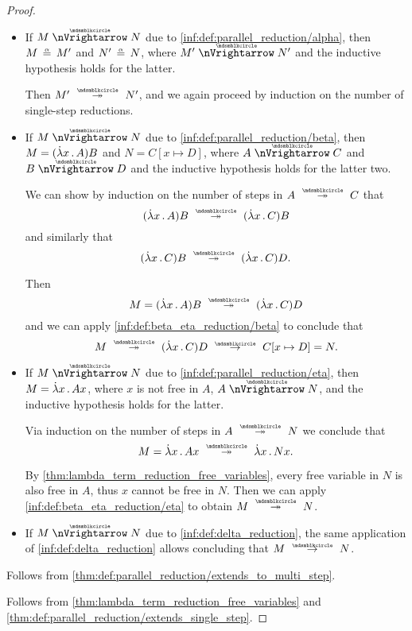\begin{proof}
\begin{itemize}
    \item If \( M \ppred N \) due to \ref{inf:def:parallel_reduction/alpha}, then \( M \aequiv M' \) and \( N' \aequiv N \), where \( M' \ppred N' \) and the inductive hypothesis holds for the latter.

    Then \( M' \pred* N' \), and we again proceed by induction on the number of single-step reductions.

    \item If \( M \ppred N \) due to \ref{inf:def:parallel_reduction/beta}, then \( M = (\qabs x A)B \) and \( N = C[x \mapsto D] \), where \( A \ppred C \) and \( B \ppred D \) and the inductive hypothesis holds for the latter two.

    We can show by induction on the number of steps in \( A \pred* C \) that
    \begin{equation*}
      (\qabs x A)B \pred* (\qabs x C)B
    \end{equation*}
    and similarly that
    \begin{equation*}
      (\qabs x C)B \pred* (\qabs x C)D.
    \end{equation*}

    Then
    \begin{equation*}
      M = (\qabs x A) B \pred* (\qabs x C)D
    \end{equation*}
    and we can apply \ref{inf:def:beta_eta_reduction/beta} to conclude that
    \begin{equation*}
      M \pred* (\qabs x C)D \pred C[x \mapsto D] = N.
    \end{equation*}

    \item If \( M \ppred N \) due to \ref{inf:def:parallel_reduction/eta}, then \( M = \qabs x A x \), where \( x \) is not free in \( A \), \( A \ppred N \), and the inductive hypothesis holds for the latter.

    Via induction on the number of steps in \( A \pred* N \) we conclude that
    \begin{equation*}
      M = \qabs x A x \pred* \qabs x N x.
    \end{equation*}

    By \cref{thm:lambda_term_reduction_free_variables}, every free variable in \( N \) is also free in \( A \), thus \( x \) cannot be free in \( N \). Then we can apply \ref{inf:def:beta_eta_reduction/eta} to obtain \( M \pred* N \).

    \item If \( M \ppred N \) due to \ref{inf:def:delta_reduction}, the same application of \ref{inf:def:delta_reduction} allows concluding that \( M \pred N \).
  \end{itemize}

   Follows from \cref{thm:def:parallel_reduction/extends_to_multi_step}.

   Follows from \cref{thm:lambda_term_reduction_free_variables} and \cref{thm:def:parallel_reduction/extends_single_step}.
\end{proof}

